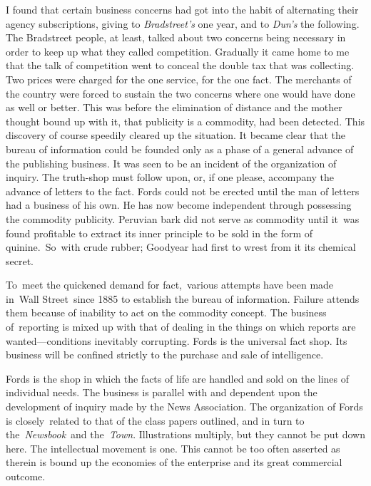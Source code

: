 \documentclass[twoside,symmetric,nobib,justified]{tufte-book}
\begin{document}
I found that certain business concerns had got into the habit of
alternating their agency subscriptions, giving to \emph{Bradstreet's}
one year, and to \emph{Dun's} the following. The Bradstreet people, at
least, talked about two concerns being necessary in order to keep up
what they called competition. Gradually it came home to me that the talk
of competition went to conceal the double tax that was collecting. Two
prices were charged for the one service, for the one fact. The merchants
of the country were forced to sustain the two concerns where one would
have done as well or better. This was before the elimination of distance
and the mother thought bound up with it, that publicity is a commodity,
had been detected. This discovery of course speedily cleared up the
situation. It became clear that the bureau of information could be
founded only as a phase of a general advance of the publishing business.
It was seen to be an incident of the organization of inquiry. The
truth-shop must follow upon, or, if one please, accompany the advance of
letters to the fact. Fords could not be erected until the man of letters
had a business of his own. He has now become independent through
possessing the commodity publicity. Peruvian bark did not serve as
commodity until it~was found profitable to extract its inner principle
to be sold in the form of quinine.~So~with crude rubber; Goodyear had
first to wrest from it its chemical secret.~~

To~meet the quickened demand for fact,~various attempts have been made
in~Wall Street~since 1885 to establish the bureau of information.
Failure attends them because of inability to act on the commodity
concept. The business of~reporting is mixed up with that of dealing in
the things on which reports are wanted---conditions inevitably
corrupting. Fords is the universal fact shop. Its business will be
confined strictly to the purchase and sale of intelligence.~

Fords is the shop in which the facts of life are handled and sold on the
lines of individual needs. The business is parallel with and dependent
upon the development of inquiry made by the News Association. The
organization of Fords is closely~related to that of the class papers
outlined, and in turn to the~\emph{Newsbook}~and the\emph{~Town}.
Illustrations multiply, but they cannot be put down here. The
intellectual movement is one. This cannot be too often asserted as
therein is bound up the economies of the enterprise and its great
commercial outcome.~
\end{document}
